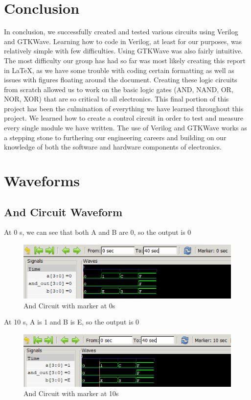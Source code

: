 \documentclass[12pt]{article}
\begin{document}
\section{Conclusion}

In conclusion, we successfully created and tested various circuits using Verilog and GTKWave. Learning how to code in Verilog, at least for our purposes, was relatively simple with few difficulties. Using GTKWave was also fairly intuitive. The most difficulty our group has had so far was most likely creating this report in LaTeX, as we have some trouble with coding certain formatting as well as issues with figures floating around the document. Creating these logic circuits from scratch allowed us to work on the basic logic gates (AND, NAND, OR, NOR, XOR) that are so critical to all electronics. This final portion of this project has been the culmination of everything we have learned throughout this project. We learned how to create a control circuit in order to test and measure every single module we have written. The use of Verilog and GTKWave works as a stepping stone to furthering our engineering careers and building on our knowledge of both the software and hardware components of electronics. 


\newpage

\section{Waveforms}



\subsection{And Circuit Waveform}

At 0 s, we can see that both A and B are 0, so the output is 0
\begin{figure}[h]
    \centering
    \includegraphics[width = 1.0\textwidth]{figs/And0.png}
    \caption{And Circuit with marker at 0s}
    \label{fig:enter-label}
\end{figure}

At 10 s, A is 1 and B is E, so the output is 0
\begin{figure}[h]
    \centering
    \includegraphics[width = 1.0\textwidth]{figs/And10.png}
    \caption{And Circuit with marker at 10s}
    \label{fig:enter-label}
\end{figure}
\end{document}
